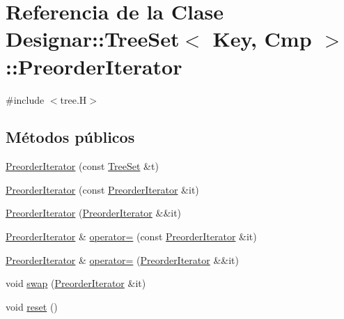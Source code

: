 \hypertarget{class_designar_1_1_tree_set_1_1_preorder_iterator}{}\section{Referencia de la Clase Designar\+:\+:Tree\+Set$<$ Key, Cmp $>$\+:\+:Preorder\+Iterator}
\label{class_designar_1_1_tree_set_1_1_preorder_iterator}


{\ttfamily \#include $<$tree.\+H$>$}

\subsection*{Métodos públicos}
\begin{DoxyCompactItemize}
\item 
\hyperlink{class_designar_1_1_tree_set_1_1_preorder_iterator_adc001b3f3f4d1783b3c0100573c78e82}{Preorder\+Iterator} (const \hyperlink{class_designar_1_1_tree_set}{Tree\+Set} \&t)
\item 
\hyperlink{class_designar_1_1_tree_set_1_1_preorder_iterator_a248d1432d0076b5e906eba1105b8cafe}{Preorder\+Iterator} (const \hyperlink{class_designar_1_1_tree_set_1_1_preorder_iterator}{Preorder\+Iterator} \&it)
\item 
\hyperlink{class_designar_1_1_tree_set_1_1_preorder_iterator_a150416f170b753cea35af2a97c273850}{Preorder\+Iterator} (\hyperlink{class_designar_1_1_tree_set_1_1_preorder_iterator}{Preorder\+Iterator} \&\&it)
\item 
\hyperlink{class_designar_1_1_tree_set_1_1_preorder_iterator}{Preorder\+Iterator} \& \hyperlink{class_designar_1_1_tree_set_1_1_preorder_iterator_a363ca040cb12714989c19775d68d5f88}{operator=} (const \hyperlink{class_designar_1_1_tree_set_1_1_preorder_iterator}{Preorder\+Iterator} \&it)
\item 
\hyperlink{class_designar_1_1_tree_set_1_1_preorder_iterator}{Preorder\+Iterator} \& \hyperlink{class_designar_1_1_tree_set_1_1_preorder_iterator_a4529fb706d5adfe1b90adfb44b88ffd2}{operator=} (\hyperlink{class_designar_1_1_tree_set_1_1_preorder_iterator}{Preorder\+Iterator} \&\&it)
\item 
void \hyperlink{class_designar_1_1_tree_set_1_1_preorder_iterator_ad73821de15e9066c6559a0d99bd9a8a6}{swap} (\hyperlink{class_designar_1_1_tree_set_1_1_preorder_iterator}{Preorder\+Iterator} \&it)
\item 
void \hyperlink{class_designar_1_1_tree_set_1_1_preorder_iterator_a0f3df9413ded80888e75706e65c919b0}{reset} ()

\end{DoxyCompactItemize}
